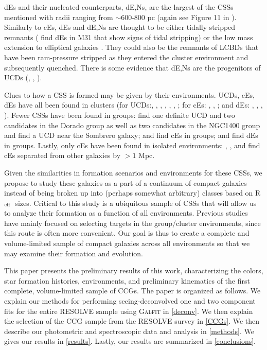 \documentclass[iop,apj]{emulateapj}
\newcommand{\Reff}{R$_{\rm eff}$}
\begin{document}
dEs and their nucleated counterparts, dE,Ns, are the largest of the CSSs mentioned with radii ranging from $\sim$600-800 pc (again see Figure 11 in \citet{Norris2014}). Similarly to cEs, dEs and dE,Ns are thought to be either tidally stripped remnants (\citet{Crnojevi2014} find dEs in M31 that show signs of tidal stripping) or the low mass extension to elliptical galaxies \citep{Crawford2016}. They could also be the remnants of LCBDs that have been ram-pressure stripped as they entered the cluster environment and subsequently quenched. There is some evidence that dE,Ns are the progenitors of UCDs (\citet{Pfeffer2013}, \citet{Zhang2015}, \citet{Liu2015}).

Clues to how a CSS is formed may be given by their environments. UCDs, cEs, dEs have all been found in clusters (for UCDs:\citet{Price2009}, \citet{Madrid2010}, \citet{Hasegan2005}, \citet{Jones2006}, \citet{Mieske2009}, \citet{Wehner2007}, \citet{Misgeld2008}; for cEs: \citet{Chilingarian2007}, \citet{SmithCastelli2012}, \citet{Price2009}; and dEs: \citep{SmithCastelli2012}, \citet{Koo1994}, \citet{Guzman1996}, \citet{Crawford2016}). Fewer CSSs have been found in groups: \citet{Evstigneeva2007} find one definite UCD and two candidates in the Dorado group as well as two candidates in the NGC1400 group and \citet{Hau2009} find a UCD near the Sombrero galaxy; \citet{Huxor2011} and \citet{Chilingarian2010} find cEs in groups; and \citet{Crnojevi2014}  \citet{Penny2014} find dEs in groups. Lastly, only cEs have been found in isolated environments: \citet{Huxor2013}, \citet{Paudel2014}, and \citet{Chilingarian2015} find cEs separated from other galaxies by $>1$ Mpc.

Given the similarities in formation scenarios and environments for these CSSs, we propose to study these galaxies as a part of a continuum of compact galaxies instead of being broken up into (perhaps somewhat arbitrary) classes based on \Reff\ sizes. Critical to this study is a ubiquitous sample of CSSs that will allow us to analyze their formation as a function of all environments. Previous studies have mainly focused on selecting targets in the group/cluster environments, since this route is often more convenient. Our goal is thus to create a complete and volume-limited sample of compact galaxies across all environments so that we may examine their formation and evolution.

This paper presents the preliminary results of this work, characterizing the colors, star formation histories, environments, and preliminary kinematics of the first complete, volume-limited sample of CCGs. The paper is organized as follows. We explain our methods for performing seeing-deconvolved one and two component fits for the entire RESOLVE sample using \textsc{Galfit} in \autoref{deconv}. We then explain the selection of the CCG sample from the RESOLVE survey in \autoref{CCGs}. We then describe our photometric and spectroscopic data and analysis in \autoref{methods}. We gives our results in \autoref{results}. Lastly, our results are summarized in \autoref{conclusions}.
\end{document}
